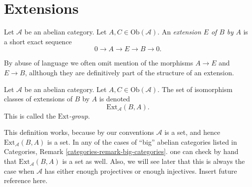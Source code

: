 \section{Extensions}
\label{section-extensions}

\begin{definition}
\label{definition-extension}
Let $\mathcal{A}$ be an abelian category.
Let $A, C \in \text{Ob}(\mathcal{A})$.
An {\it extension $E$ of $B$ by $A$} is a short
exact sequence
$$
0 \to A \to E \to B \to 0.
$$
\end{definition}

\noindent
By abuse of language we often omit mention of the
morphisms $A \to E$ and $E \to B$, allthough they are
definitively part of the structure of an extension.

\begin{definition}
\label{definition-ext-group}
Let $\mathcal{A}$ be an abelian category.
Let $A, C \in \text{Ob}(\mathcal{A})$.
The set of isomorphism classes of extensions
of $B$ by $A$ is denoted
$$
\text{Ext}_\mathcal{A}(B, A).
$$
This is called the {\it $\text{Ext}$-group}.
\end{definition}

\noindent
This definition works, because by our conventions
$\mathcal{A}$ is a set, and hence
$\text{Ext}_\mathcal{A}(B, A)$ is a set.
In any of the cases of ``big'' abelian categories
listed in Categories, Remark \ref{categories-remark-big-categories}.
one can check by hand that $\text{Ext}_\mathcal{A}(B, A)$
is a set as well. Also, we will see later that this is
always the case when $\mathcal{A}$ has either enough projectives
or enough injectives. Insert future reference here.

